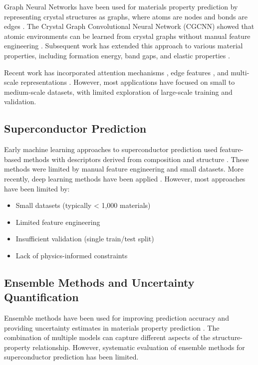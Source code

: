 \documentclass[11pt,a4paper]{article}
\begin{document}
Graph Neural Networks have been used for materials property prediction by representing crystal structures as graphs, where atoms are nodes and bonds are edges \citep{xie2018crystal}. The Crystal Graph Convolutional Neural Network (CGCNN) showed that atomic environments can be learned from crystal graphs without manual feature engineering \citep{xie2018crystal}. Subsequent work has extended this approach to various material properties, including formation energy, band gaps, and elastic properties \citep{chen2019graph, park2017developing}.

Recent work has incorporated attention mechanisms \citep{velickovic2017graph}, edge features \citep{schutt2017quantum}, and multi-scale representations \citep{deudon2020learning}. However, most applications have focused on small to medium-scale datasets, with limited exploration of large-scale training and validation.

\subsection{Superconductor Prediction}

Early machine learning approaches to superconductor prediction used feature-based methods with descriptors derived from composition and structure \citep{stanev2018machine}. These methods were limited by manual feature engineering and small datasets. More recently, deep learning methods have been applied \citep{hamidieh2018data}. However, most approaches have been limited by:

\begin{itemize}
    \item Small datasets (typically < 1,000 materials)
    \item Limited feature engineering
    \item Insufficient validation (single train/test split)
    \item Lack of physics-informed constraints
\end{itemize}

\subsection{Ensemble Methods and Uncertainty Quantification}

Ensemble methods have been used for improving prediction accuracy and providing uncertainty estimates in materials property prediction \citep{ward2016general}. The combination of multiple models can capture different aspects of the structure-property relationship. However, systematic evaluation of ensemble methods for superconductor prediction has been limited.
\end{document}
